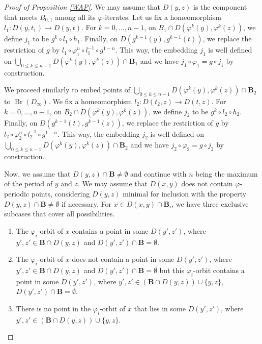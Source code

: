\documentclass[JEP,XML,SOM,Unicode,NoFloatCountersInSection]{cedram}
\theoremstyle{plain}
\theoremstyle{definition}
\newcommand{\bB}{{\boldsymbol{B}}}
\DeclareMathOperator{\Br}{Br}
\begin{document}
\begin{proof}[Proof of Proposition \ref{WAP}]
We may assume that $D(y,z)$ is the component that meets $B_{0,1}$ among all its $\varphi$-iterates. Let us fix a homeomorphism $l_1\colon D(y,t_1)\to D(y,t)$. For $k=0,\dots,n-1$, on $B_{1}\cap D(\varphi^k(y),\varphi^k(z))$, we define $j_1$ to be $g^k\circ l_1\circ h_1$. Finally, on $D(g^{k-1}(y),g^{k-1}(t))$, we replace the restriction of $g$ by $l_1\circ\varphi_1^n\circ l_1^{-1}\circ g^{1-n}$. This way, the embedding $j_1$ is well defined on $\bigcup_{0\leq k\leq n-1} D(\varphi^k(y),\varphi^k(z))\cap \bB_1$ and we have $j_1\circ\varphi_1=g\circ j_1$ by construction.

We proceed similarly to embed points of $\bigcup_{0\leq k\leq n-1} D(\varphi^k(y),\varphi^k(z))\cap \bB_2$ to $\Br(D_\infty)$. We fix a homeomorphism $l_2\colon D(t_2,z)\to D(t,z)$. For $k=0,\dots,n-1$, on $B_{2}\cap D(\varphi^k(y),\varphi^k(z))$, we define $j_2$ to be $g^k\circ l_2\circ h_2$. Finally, on $D(g^{k-1}(t),g^{k-1}(z))$, we replace the restriction of $g$ by $l_2\circ\varphi_2^n\circ l_2^{-1}\circ g^{1-n}$. This way, the embedding $j_2$ is well defined on $\bigcup_{0\leq k\leq n-1} D(\varphi^k(y),\varphi^k(z))\cap \bB_2$ and we have $j_2\circ\varphi_2=g\circ j_2$ by construction.

Now, we assume that $D(y,z)\cap\bB\neq\emptyset$ and continue with $n$ being the maximum of the period of $y$ and $z$. We may assume that $D(x,y)$ does not contain $\varphi$-periodic points, considering $D(y,z)$ minimal for inclusion with the property $D(y,z)\cap\bB\neq\emptyset$ if necessary. For $x\in D(x,y)\cap\bB_i$, we have three exclusive subcases that cover all possibilities.

\begin{enumerate}
\item\label{enum:B1} The $\varphi_i$-orbit of $x$ contains a point in some $D(y',z')$, where $y',z'\in \bB\cap D(y,z)$ and $D(y',z')\cap \bB=\emptyset$.
\item\label{enum:B2} The $\varphi_i$-orbit of $x$ does not contain a point in some $D(y',z')$, where $y',z'\in \bB\cap D(y,z)$ and $D(y',z')\cap \bB=\emptyset$ but this $\varphi_i$-orbit contains a point in some $D(y',z')$, where $y',z'\in (\bB\cap D(y,z))\cup\{y,z\}$, $D(y',z')\cap \bB=\emptyset$.
\item\label{enum:B3} There is no point in the $\varphi_i$-orbit of $x$ that lies in some $D(y',z')$, where $y',z'\in (\bB\cap D(y,z))\cup\{y,z\}$.\end{enumerate}


\end{proof}
\end{document}
